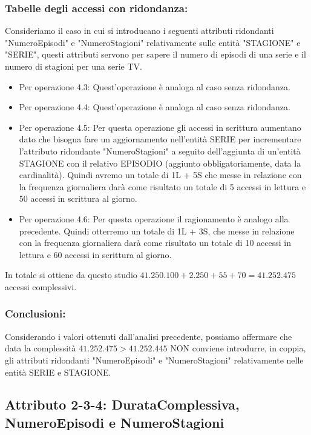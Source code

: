\documentclass[a4paper,12pt]{report}
\begin{document}
\subsubsection{Tabelle degli accessi con ridondanza:}
Consideriamo il caso in cui si introducano i seguenti attributi ridondanti "NumeroEpisodi" e "NumeroStagioni" relativamente sulle entità "STAGIONE" e "SERIE", questi attributi servono per sapere il numero di episodi di una serie e il numero di stagioni per una serie TV.
\begin{itemize}
	\item Per operazione 4.3: Quest'operazione è analoga al caso senza ridondanza.
	\item Per operazione 4.4: Quest'operazione è analoga al caso senza ridondanza.
	\item Per operazione 4.5: Per questa operazione gli accessi in scrittura aumentano dato che bisogna fare un aggiornamento nell'entità SERIE per incrementare l'attributo ridondante "NumeroStagioni" a seguito dell'aggiunta di un'entità STAGIONE con il relativo EPISODIO (aggiunto obbligatoriamente, data la cardinalità). 
	Quindi avremo un totale di 1L + 5S che messe in relazione con la frequenza giornaliera darà come risultato un totale di 5 accessi in lettura e 50 accessi in scrittura al giorno.
	\item Per operazione 4.6: Per questa operazione il ragionamento è analogo alla precedente. Quindi otterremo un totale di 1L + 3S, che messe in relazione con la frequenza giornaliera darà come risultato un totale di 10 accessi in lettura e 60 accessi in scrittura al giorno.
\end{itemize}

In totale si ottiene da questo studio $41.250.100 + 2.250 + 55 + 70 = 41.252.475$ accessi complessivi.
\subsubsection{Conclusioni:}
Considerando i valori ottenuti dall'analisi precedente, possiamo affermare che data la complessità $41.252.475 > 41.252.445$ NON conviene introdurre, in coppia, gli attributi ridondanti "NumeroEpisodi" e "NumeroStagioni" relativamente nelle entità SERIE e STAGIONE.


\subsection{Attributo 2-3-4: DurataComplessiva, NumeroEpisodi e NumeroStagioni}
\end{document}
